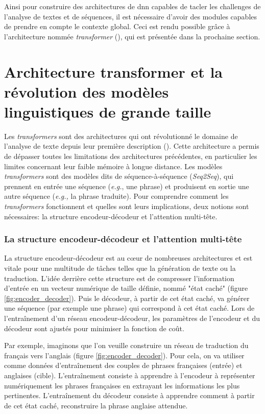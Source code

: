 Ainsi pour construire des architectures de \gls{dnn} capables de tacler les challenges de l'analyse de textes et de séquences, il est nécessaire d'avoir des modules capables de prendre en compte le contexte global. Ceci est rendu possible grâce à l'architecture nommée \textit{transformer} (\cite{vaswani_attention_2017}), qui est présentée dans la prochaine section.


\section{Architecture transformer et la révolution des modèles linguistiques de grande taille}
Les \textit{transformers} sont des architectures qui ont révolutionné le domaine de l'analyse de texte depuis leur première description (\cite{vaswani_attention_2017}). Cette architecture a permis de dépasser toutes les limitations des architectures précédentes, en particulier les limites concernant leur faible mémoire à longue distance. Les modèles \textit{transformers} sont des modèles dits de séquence-à-séquence (\textit{Seq2Seq}), qui prennent en entrée une séquence (\textit{e.g.}, une phrase) et produisent en sortie une autre séquence (\textit{e.g.,} la phrase traduite). Pour comprendre comment les \textit{transformers} fonctionnent et quelles sont leurs implications, deux notions sont nécessaires: la structure encodeur-décodeur et l'attention multi-tête.

\subsubsection{La structure encodeur-décodeur et l'attention multi-tête}
La structure encodeur-décodeur est au cœur de nombreuses architectures et est vitale pour une multitude de tâches telles que la génération de texte ou la traduction. L'idée derrière cette structure est de compresser l'information d'entrée en un vecteur numérique de taille définie, nommé "état caché" (figure \ref{fig:encoder_decoder}). Puis le décodeur, à partir de cet état caché, va générer une séquence (par exemple une phrase) qui correspond à cet état caché. Lors de l'entraînement d'un réseau encodeur-décodeur, les paramètres de l'encodeur et du décodeur sont ajustés pour minimiser la fonction de coût. 


Par exemple, imaginons que l'on veuille construire un réseau de traduction du français vers l’anglais (figure \ref{fig:encoder_decoder}). Pour cela, on va utiliser comme données d'entraînement des couples de phrases françaises (entrée) et anglaises (cible). L'entraînement consiste à apprendre à l'encodeur à représenter numériquement les phrases françaises en extrayant les informations les plus pertinentes. L'entraînement du décodeur consiste à apprendre comment à partir de cet état caché, reconstruire la phrase anglaise attendue.


